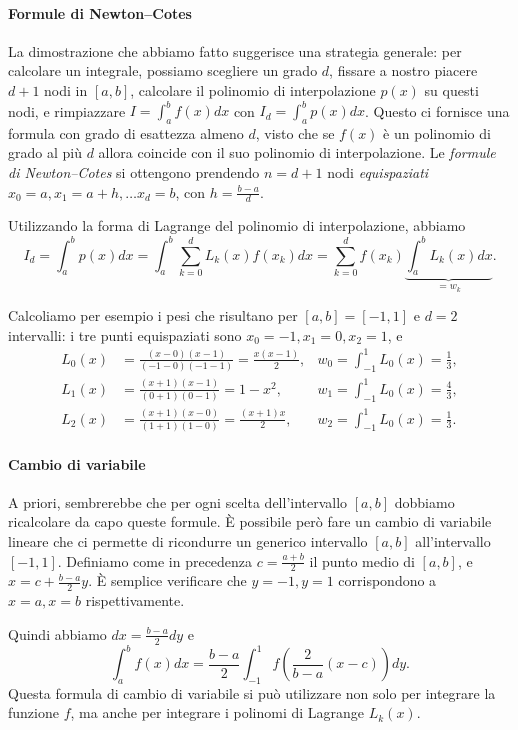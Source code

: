 \documentclass[a4paper]{report}
\theoremstyle{definiton}
\theoremstyle{remark}
\begin{document}
\paragraph{Formule di Newton--Cotes} La dimostrazione che abbiamo fatto suggerisce una strategia generale: per calcolare un integrale, possiamo scegliere un grado $d$, fissare a nostro piacere $d+1$ nodi in $[a,b]$, calcolare il polinomio di interpolazione $p(x)$ su questi nodi, e rimpiazzare $I = \int_a^b f(x) dx$ con $I_d = \int_a^b p(x) dx$. Questo ci fornisce una formula con grado di esattezza almeno $d$, visto che se $f(x)$ è un polinomio di grado al più $d$ allora coincide con il suo polinomio di interpolazione. Le \emph{formule di Newton--Cotes} si ottengono prendendo $n = d+1$ nodi \emph{equispaziati} $x_0=a, x_1=a+h,\dots x_{d}=b$, con $h = \frac{b-a}{d}$.

Utilizzando la forma di Lagrange del polinomio di interpolazione, abbiamo
\[
I_d = \int_a^b p(x) dx = \int_a^b \sum_{k=0}^d L_k(x)f(x_k) dx = \sum_{k=0}^d f(x_k) \underbrace{\int_a^b L_k(x) dx}_{=w_k}.
\]

Calcoliamo per esempio i pesi che risultano per $[a,b]=[-1,1]$ e $d=2$ intervalli: i tre punti equispaziati sono $x_0=-1,x_1=0,x_2 = 1$, e 
\begin{align*}
L_0(x) &= \frac{(x-0)(x-1)}{(-1-0)(-1-1)} = \frac{x(x-1)}{2}, & w_0 = \int_{-1}^1 L_0(x) = \frac13, \\
L_1(x) &= \frac{(x+1)(x-1)}{(0+1)(0-1)} = 1-x^2, & w_1 = \int_{-1}^1 L_0(x) = \frac43, \\
L_2(x) &= \frac{(x+1)(x-0)}{(1+1)(1-0)}  = \frac{(x+1)x}{2}, & w_2 = \int_{-1}^1 L_0(x) = \frac13.
\end{align*}

\paragraph{Cambio di variabile} A priori, sembrerebbe che per ogni scelta dell'intervallo $[a,b]$ dobbiamo ricalcolare da capo queste formule. È possibile però fare un cambio di variabile lineare che ci permette di ricondurre un generico intervallo $[a,b]$ all'intervallo $[-1,1]$. Definiamo come in precedenza $c=\frac{a+b}{2}$ il punto medio di $[a,b]$, e $x = c + \frac{b-a}{2}y$. È semplice verificare che $y=-1,y=1$ corrispondono a $x=a,x=b$ rispettivamente. 

Quindi abbiamo $dx = \frac{b-a}{2}dy$ e 
\[
\int_{a}^b f(x)dx = \frac{b-a}{2}\int_{-1}^1 f\left(\frac{2}{b-a}(x-c)\right) dy.
\]
Questa formula di cambio di variabile si può utilizzare non solo per integrare la funzione $f$, ma anche per integrare i polinomi di Lagrange $L_k(x)$.
\end{document}
